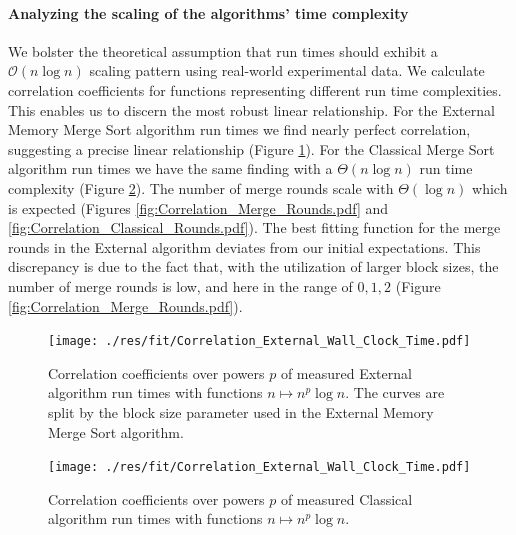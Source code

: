 \documentclass[twocolumn]{article}
\begin{document}
\paragraph*{Analyzing the scaling of the algorithms' time complexity}
We bolster the theoretical assumption that run times should exhibit a \( \mathcal{O} (n \log n) \) scaling pattern using real-world experimental data.
We calculate correlation coefficients for functions representing different run time complexities. This enables us to discern the most robust linear relationship.
For the External Memory Merge Sort algorithm run times we find nearly perfect correlation, suggesting a precise linear relationship (Figure \ref{fig:Correlation_External_Wall_Clock_Time.pdf}).
For the Classical Merge Sort algorithm run times we have the same finding with a \( \Theta(n \log n) \) run time complexity (Figure \ref{fig:Correlation_Classical_Wall_Clock_Time.pdf}).
The number of merge rounds scale with \( \Theta (\log n) \) which is expected (Figures \ref{fig:Correlation_Merge_Rounds.pdf} and \ref{fig:Correlation_Classical_Rounds.pdf}).
The best fitting function for the merge rounds in the External algorithm deviates from our initial expectations. This discrepancy is due to the fact that, with the utilization of larger block sizes, the number of merge rounds is low, and here in the range of \( 0, 1, 2 \) (Figure \ref{fig:Correlation_Merge_Rounds.pdf}).

\begin{figure}[htb]
    \begin{minipage}{0.475 \textwidth}
        \centering
        \texttt{[image: ./res/fit/Correlation\_External\_Wall\_Clock\_Time.pdf]}
        \caption{Correlation coefficients over powers \( p \) of measured External algorithm run times with functions \( n \mapsto n^p \log n\). The curves are split by the block size parameter used in the External Memory Merge Sort algorithm.}
        \label{fig:Correlation_External_Wall_Clock_Time.pdf}
    \end{minipage}
\end{figure}

\begin{figure}[htb]
    \begin{minipage}{0.475 \textwidth}
        \centering
        \texttt{[image: ./res/fit/Correlation\_External\_Wall\_Clock\_Time.pdf]}
        \caption{Correlation coefficients over powers \( p \) of measured Classical algorithm run times with functions \( n \mapsto n^p \log n\).}
        \label{fig:Correlation_Classical_Wall_Clock_Time.pdf}
    \end{minipage}
\end{figure}
\end{document}
